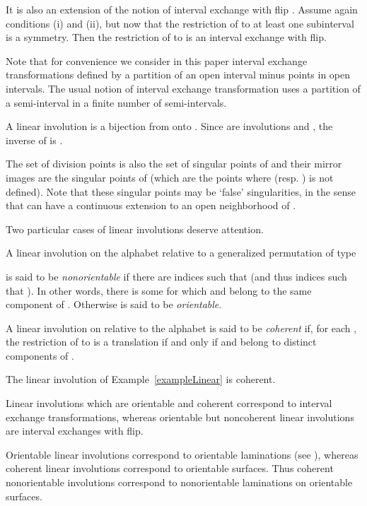 \documentclass[preprint,12pt]{elsarticle}
\numberwithin{theorem}{section}
\numberwithin{equation}{section}
\numberwithin{figure}{section}
\numberwithin{table}{section}
\begin{document}
It is also an extension of the notion of interval exchange with flip
\cite{Nogueira1989,NogueiraPiresTroubetzkoy2013}. Assume again  conditions (i)
and (ii), but now that the restriction of 
to at least one  subinterval is a symmetry. Then the restriction of 
to  is an interval exchange  with flip.


Note that for convenience we consider in this paper interval exchange transformations
defined by a partition of an open interval  minus
 points in 
 open intervals. The usual notion of interval exchange transformation
uses a partition of a semi-interval in a finite number of semi-intervals.


A linear involution  is a bijection from 
onto .
Since  are involutions and ,
 the inverse of 
is .

The set  of division points is also the set of singular points
of  and their mirror images are the singular points of 
(which are the points where  (resp. ) is not defined).
Note that these singular points  may be `false' singularities, in the sense
that  can have a continuous extension to an open neighborhood of .



Two particular cases of linear involutions deserve attention.

A linear involution  on the alphabet  
relative to a generalized permutation  of type
 
is said to be \emph{nonorientable} if there are indices  such that
  (and thus indices 
such that ).  In other words,  there is  some  for which  
and  belong to  the same component  of . Otherwise
 is said to be \emph{orientable}.  


A linear involution  on 
relative to the alphabet 
is said to be \emph{coherent} if, for each , the restriction
of  to  is a translation if and only if 
and  belong to distinct components of . 

\begin{example}
The linear involution of Example~\ref{exampleLinear} is coherent.
\end{example}

Linear involutions which are orientable and coherent
correspond to interval exchange transformations, 
whereas  orientable but noncoherent  linear
involutions are interval exchanges with flip.

Orientable linear involutions correspond to orientable laminations (see
\cite{BertheDelecroixDolcePerrinReutenauerRindone2014}), whereas 
 coherent
linear involutions correspond to orientable surfaces. Thus coherent
nonorientable involutions correspond to nonorientable laminations
on orientable surfaces.
\end{document}
